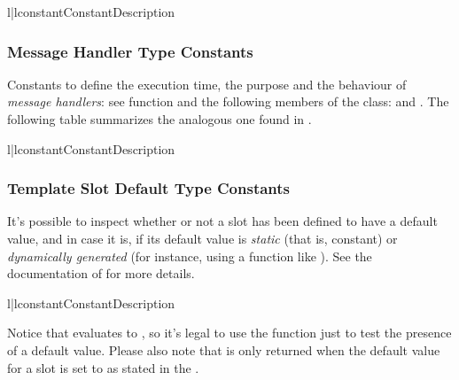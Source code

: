 \begin{tableii}{l|l}{constant}{Constant}{Description}
\end{tableii}


\subsubsection{Message Handler Type Constants}

Constants to define the execution time, the purpose and the behaviour of
\emph{message handlers}: see function 
and the following members of the  class:
 and .
The following table summarizes the analogous one found in \clipsbpg{}.

\begin{tableii}{l|l}{constant}{Constant}{Description}
\end{tableii}


\subsubsection{Template Slot Default Type Constants}

It's possible to inspect whether or not a  slot has been
defined to have a default value, and in case it is, if its default value
is \emph{static} (that is, constant) or \emph{dynamically generated} (for
instance, using a function like ). See the documentation of
 for more details.

\begin{tableii}{l|l}{constant}{Constant}{Description}
\end{tableii}

Notice that  evaluates to , so it's
legal to use the  function just to
test the presence of a default value. Please also note that
 is only returned when the default value for a slot
is set to  as stated in the \clipsapg{}.


